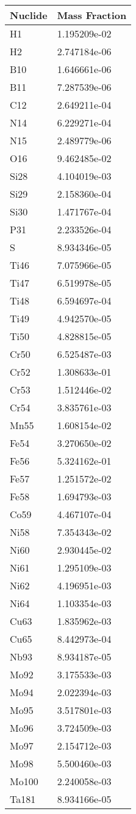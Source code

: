 \begin{centering}
\begin{longtable}[ht!]
\caption{Table showing the isotopic description of material UPPFW}
\label{table:material_UPPFW}
\end{longtable}\clearpage

\begin{longtable}[ht!]
{ p{} | p{} }
\hline
Nuclide & Mass Fraction\\
\hline
H1 & 1.195209e-02\\
H2 & 2.747184e-06\\
B10 & 1.646661e-06\\
B11 & 7.287539e-06\\
C12 & 2.649211e-04\\
N14 & 6.229271e-04\\
N15 & 2.489779e-06\\
O16 & 9.462485e-02\\
Si28 & 4.104019e-03\\
Si29 & 2.158360e-04\\
Si30 & 1.471767e-04\\
P31 & 2.233526e-04\\
S & 8.934346e-05\\
Ti46 & 7.075966e-05\\
Ti47 & 6.519978e-05\\
Ti48 & 6.594697e-04\\
Ti49 & 4.942570e-05\\
Ti50 & 4.828815e-05\\
Cr50 & 6.525487e-03\\
Cr52 & 1.308633e-01\\
Cr53 & 1.512446e-02\\
Cr54 & 3.835761e-03\\
Mn55 & 1.608154e-02\\
Fe54 & 3.270650e-02\\
Fe56 & 5.324162e-01\\
Fe57 & 1.251572e-02\\
Fe58 & 1.694793e-03\\
Co59 & 4.467107e-04\\
Ni58 & 7.354343e-02\\
Ni60 & 2.930445e-02\\
Ni61 & 1.295109e-03\\
Ni62 & 4.196951e-03\\
Ni64 & 1.103354e-03\\
Cu63 & 1.835962e-03\\
Cu65 & 8.442973e-04\\
Nb93 & 8.934187e-05\\
Mo92 & 3.175533e-03\\
Mo94 & 2.022394e-03\\
Mo95 & 3.517801e-03\\
Mo96 & 3.724509e-03\\
Mo97 & 2.154712e-03\\
Mo98 & 5.500460e-03\\
Mo100 & 2.240058e-03\\
Ta181 & 8.934166e-05\\


\end{longtable}
\end{centering}
